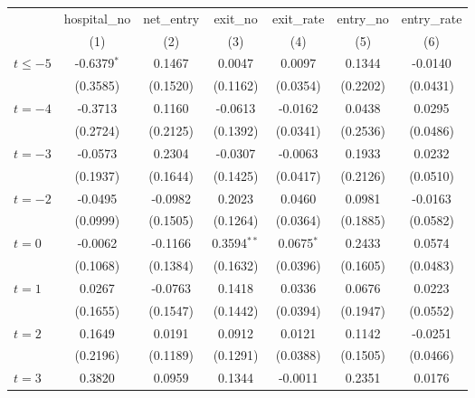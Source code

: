 \begingroup
\centering
\begin{tabular}{lcccccc}
   \toprule
                          & hospital\_no  & net\_entry  & exit\_no      & exit\_rate   & entry\_no  & entry\_rate \\    
                          & (1)           & (2)         & (3)           & (4)          & (5)        & (6)\\  
   \midrule 
   $t \leq -5$            & -0.6379$^{*}$ & 0.1467      & 0.0047        & 0.0097       & 0.1344     & -0.0140\\   
                          & (0.3585)      & (0.1520)    & (0.1162)      & (0.0354)     & (0.2202)   & (0.0431)\\   
   $t = -4$               & -0.3713       & 0.1160      & -0.0613       & -0.0162      & 0.0438     & 0.0295\\   
                          & (0.2724)      & (0.2125)    & (0.1392)      & (0.0341)     & (0.2536)   & (0.0486)\\   
   $t = -3$               & -0.0573       & 0.2304      & -0.0307       & -0.0063      & 0.1933     & 0.0232\\   
                          & (0.1937)      & (0.1644)    & (0.1425)      & (0.0417)     & (0.2126)   & (0.0510)\\   
   $t = -2$               & -0.0495       & -0.0982     & 0.2023        & 0.0460       & 0.0981     & -0.0163\\   
                          & (0.0999)      & (0.1505)    & (0.1264)      & (0.0364)     & (0.1885)   & (0.0582)\\   
   $t = 0$                & -0.0062       & -0.1166     & 0.3594$^{**}$ & 0.0675$^{*}$ & 0.2433     & 0.0574\\   
                          & (0.1068)      & (0.1384)    & (0.1632)      & (0.0396)     & (0.1605)   & (0.0483)\\   
   $t = 1$                & 0.0267        & -0.0763     & 0.1418        & 0.0336       & 0.0676     & 0.0223\\   
                          & (0.1655)      & (0.1547)    & (0.1442)      & (0.0394)     & (0.1947)   & (0.0552)\\   
   $t = 2$                & 0.1649        & 0.0191      & 0.0912        & 0.0121       & 0.1142     & -0.0251\\   
                          & (0.2196)      & (0.1189)    & (0.1291)      & (0.0388)     & (0.1505)   & (0.0466)\\   
   $t = 3$                & 0.3820        & 0.0959      & 0.1344        & -0.0011      & 0.2351     & 0.0176\\   

\end{tabular}
